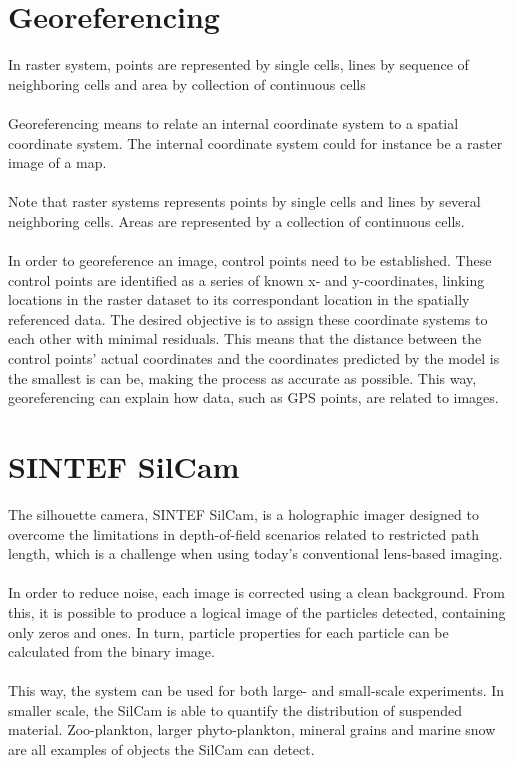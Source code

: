 \vspace{1.3cm}
\section{Georeferencing}
In raster system, points are represented by single cells, lines by sequence of neighboring cells and area by collection of continuous cells
\\\\
Georeferencing means to relate an internal coordinate system to a spatial coordinate system. The internal coordinate system could for instance be a raster image of a map. 
\\\\
Note that raster systems represents points by single cells and lines by several neighboring cells. Areas are represented by a collection of continuous cells. 
\\\\
In order to georeference an image, control points need to be established. These control points are identified as a series of known x- and y-coordinates, linking locations in the raster dataset to its correspondant location in the spatially referenced data. The desired objective is to assign these coordinate systems to each other with minimal residuals. This means that the distance between the control points’ actual coordinates and the coordinates predicted by the model is the smallest is can be, making the process as accurate as possible. This way, georeferencing can explain how data, such as GPS points, are related to images.

\vspace{1.3cm}
\section{SINTEF SilCam}
The silhouette camera, SINTEF SilCam, is a holographic imager designed to overcome the limitations in depth-of-field scenarios related to restricted path length, which is a challenge when using today's conventional lens-based imaging. 
\\\\
In order to reduce noise, each image is corrected using a clean background. From this, it is possible to produce a logical image of the particles detected, containing only zeros and ones. In turn, particle properties for each particle can be calculated from the binary image.
\\\\
This way, the system can be used for both large- and small-scale experiments. In smaller scale, the SilCam is able to quantify the distribution of suspended material. Zoo-plankton, larger phyto-plankton, mineral grains and marine snow are all examples of objects the SilCam can detect. 

